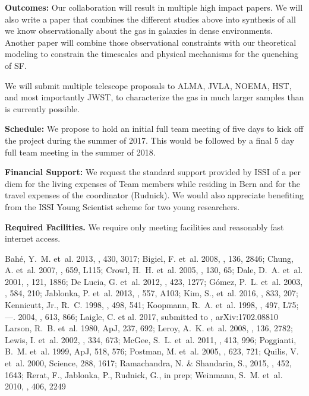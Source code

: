 \documentclass[11pt]{article}
\begin{document}
\textbf{Outcomes:} Our collaboration will result in multiple high
impact papers.  We will also write a
paper that combines the different studies above into synthesis of all we know observationally about the gas in galaxies in
dense environments.  Another paper will combine those observational
constraints with our theoretical modeling to constrain the timescales
and physical mechanisms for the quenching of SF.

We will submit multiple telescope proposals to ALMA, JVLA, NOEMA, HST, and most importantly JWST, 
 to characterize the gas in much larger samples than is currently possible.

\textbf{Schedule:} We propose to hold an initial full team meeting of five days to kick off the project during the summer of 2017. This would be followed by a final 5 day full team meeting in the summer of 2018. 

\textbf{Financial Support:} We request the standard support provided
by ISSI of a per diem for the living expenses of Team members while
residing in Bern and for the travel expenses of the coordinator
(Rudnick). We would also appreciate benefiting from the ISSI Young
Scientist scheme for two young researchers.  

\textbf{Required Facilities.}  We require only meeting facilities and
reasonably fast internet access.

\footnotesize{{Bah\'e}, Y.~M. {et~al.} 2013, \mnras, 430, 3017; 
{Bigiel}, F. {et~al.} 2008, \aj, 136, 2846; 
{Chung}, A. {et~al.} 2007, \apjl, 659, L115; 
{Crowl}, H.~H. {et~al.} 2005, \aj, 130, 65; 
{Dale}, D.~A. {et~al.} 2001, \aj, 121, 1886; 
{De Lucia}, G. {et~al.} 2012, \mnras, 423, 1277; 
{G{\' o}mez}, P.~L. {et~al.} 2003, \apj, 584, 210; 
{Jablonka}, P. {et~al.} 2013, \aap, 557, A103; 
{Kim}, S., et~al. 2016, \apj, 833, 207;
{Kennicutt}, Jr., R.~C. 1998, \apj, 498, 541; 
{Koopmann}, R.~A. {et~al.} 1998, \apjl, 497, L75; 
---. 2004, \apj, 613, 866; 
Laigle, C. et al. 2017, submitted to \mnras, arXiv:1702.08810
{Larson}, R.~B. {et~al.} 1980, ApJ, 237, 692; 
{Leroy}, A.~K. {et~al.} 2008, \aj, 136, 2782; 
{Lewis}, I. {et~al.} 2002, \mnras, 334, 673; 
{McGee}, S.~L. {et~al.} 2011, \mnras, 413, 996; 
{Poggianti}, B.~M. {et~al.} 1999, ApJ, 518, 576; 
{Postman}, M. {et~al.} 2005, \apj, 623, 721; 
{Quilis}, V. {et~al.} 2000, Science, 288, 1617; 
{Ramachandra}, N. \& {Shandarin}, S., 2015, \mnras, 452, 1643;
{Rerat}, F., Jablonka, P., Rudnick, G., in prep;
{Weinmann}, S.~M. {et~al.} 2010, \mnras, 406, 2249}
\end{document}
